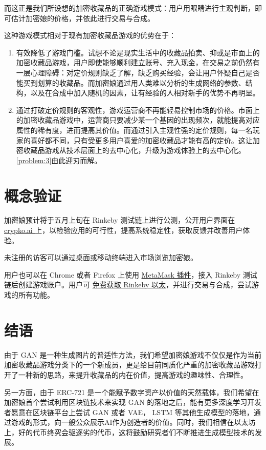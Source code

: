 \documentclass[a4paper]{article}
\begin{document}
而这正是我们所设想的加密收藏品的正确游戏模式：用户用眼睛进行主观判断，即可估计加密娘的价格，并依此进行交易与合成。

这种游戏模式相对于现有加密收藏品游戏的优势在于：

\begin{enumerate}
	\item 有效降低了游戏门槛。试想不论是现实生活中的收藏品拍卖、抑或是市面上的加密收藏品游戏，用户即使能够顺利建立账号、充入现金，在交易之前仍然有一层心理障碍：对定价规则缺乏了解，缺乏购买经验，会让用户怀疑自己是否能买到划算的收藏品。而加密娘通过用人类难以分析的生成网络的参数、结构，以及在合成中加入随机的因素，让有经验的人相对新手的优势不再明显。

	\item 通过打破定价规则的客观性，游戏运营商不再能轻易控制市场的价格。市面上的加密收藏品游戏中，运营商只要减少某一个基因的出现频次，就能提高对应属性的稀有度，进而提高其价值。而通过引入主观性强的定价规则，每一名玩家的喜好都不同，只有受更多用户喜爱的加密收藏品才能有高的定价。这让加密收藏品游戏从技术层面上的去中心化，升级为游戏体验上的去中心化。\ref{problem:3}由此迎刃而解。

\end{enumerate}

\section{概念验证}

加密娘预计将于五月上旬在 Rinkeby 测试链上进行公测，公开用户界面在 \href{http://crypko.ai}{ crypko.ai }上，以检验应用的可行性，提高系统稳定性，获取反馈并改善用户体验。

未注册的访客可以通过桌面或移动终端进入市场浏览加密娘。

用户也可以在 Chrome 或者 Firefox 上使用 \href{https://metamask.io/}{MetaMask 插件}，接入 Rinkeby 测试链后创建游戏账户。用户可 \href{https://www.rinkeby.io/#faucet}{免费获取 Rinkeby 以太}，并进行交易与合成，尝试游戏的所有功能。

\section{结语}

由于 GAN 是一种生成图片的普适性方法，我们希望加密娘游戏不仅仅是作为当前加密收藏品游戏分类下的一个新成员，更是给目前同质化严重的加密收藏品游戏打开了一种新的思路，来提升收藏品的内在价值，提高游戏的趣味性、合理性。

另一方面，由于 ERC-721 是一个能赋予数字资产以价值的天然载体，我们希望在加密娘首个尝试利用区块链技术来实现 GAN 的落地之后，能有更多深度学习开发者愿意在区块链平台上尝试 GAN 或者 VAE， LSTM 等其他生成模型的落地，通过游戏的形式，向一般公众展示AI作为创造者的价值。同时，我们相信在以太坊上，好的代币终究会驱逐劣的代币，这将鼓励研究者们不断推进生成模型技术的发展。
\end{document}
